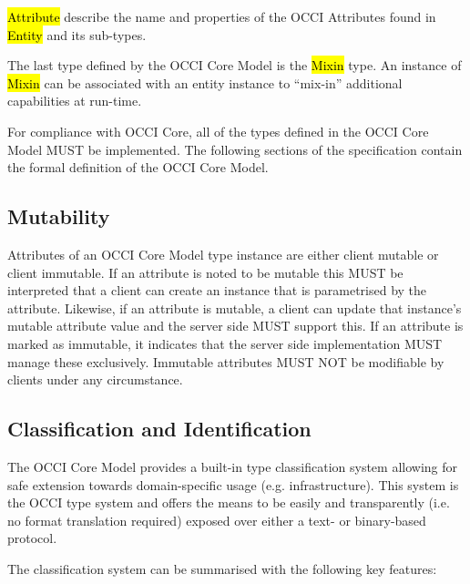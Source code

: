 \documentclass[10pt,a4paper]{article}
\begin{document}
\hl{Attribute} describe the name and properties of the OCCI Attributes found in
\hl{Entity} and its sub-types.

The last type defined by the OCCI Core Model is the \hl{Mixin}
type. An instance of \hl{Mixin} can be associated with an entity
instance to ``mix-in'' additional capabilities at run-time.

For compliance with OCCI Core, all of the types defined in the OCCI
Core Model MUST be implemented.  The following sections of the
specification contain the formal definition of the OCCI Core Model.

\subsection{Mutability}
\label{sec:mutability}
Attributes of an OCCI Core Model type instance are either client
mutable or client immutable. If an attribute is noted to be mutable
this MUST be interpreted that a client can create an instance that is
parametrised by the attribute. Likewise, if an attribute is mutable, a
client can update that instance's mutable attribute value and the
server side MUST support this. If an attribute is marked as immutable,
it indicates that the server side implementation MUST manage these
exclusively. Immutable attributes MUST NOT be modifiable by clients
under any circumstance.

\subsection{Classification and Identification}
\label{sec:classification}
The OCCI Core Model provides a built-in type classification system
allowing for safe extension towards domain-specific usage
(e.g. infrastructure). This system is the OCCI type system and offers
the means to be easily and transparently (i.e. no format translation
required) exposed over either a text- or binary-based protocol.

The classification system can be summarised with the following key
features:
\end{document}
